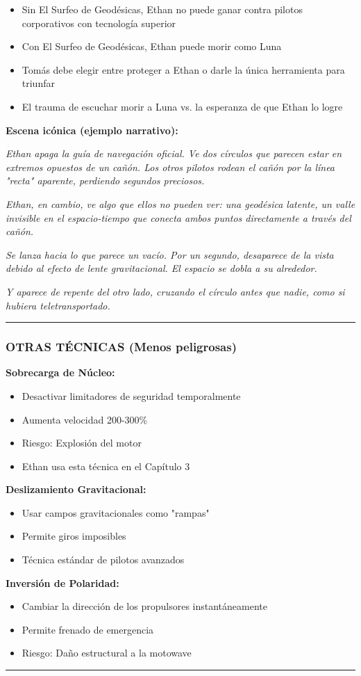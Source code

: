 \documentclass[11pt,a4paper]{report}
\begin{document}
\begin{itemize}
  \item Sin El Surfeo de Geodésicas, Ethan no puede ganar contra pilotos corporativos con tecnología superior
  \item Con El Surfeo de Geodésicas, Ethan puede morir como Luna
  \item Tomás debe elegir entre proteger a Ethan o darle la única herramienta para triunfar
  \item El trauma de escuchar morir a Luna vs. la esperanza de que Ethan lo logre

\end{itemize}
\textbf{Escena icónica (ejemplo narrativo):}

\textit{Ethan apaga la guía de navegación oficial. Ve dos círculos que parecen estar en extremos opuestos de un cañón. Los otros pilotos rodean el cañón por la línea "recta" aparente, perdiendo segundos preciosos.}

\textit{Ethan, en cambio, ve algo que ellos no pueden ver: una geodésica latente, un valle invisible en el espacio-tiempo que conecta ambos puntos directamente a través del cañón.}

\textit{Se lanza hacia lo que parece un vacío. Por un segundo, desaparece de la vista debido al efecto de lente gravitacional. El espacio se dobla a su alrededor.}

\textit{Y aparece de repente del otro lado, cruzando el círculo antes que nadie, como si hubiera teletransportado.}

\bigskip\hrule\bigskip

\subsubsection{OTRAS TÉCNICAS (Menos peligrosas)}

\textbf{Sobrecarga de Núcleo:}
\begin{itemize}
  \item Desactivar limitadores de seguridad temporalmente
  \item Aumenta velocidad 200-300\%
  \item Riesgo: Explosión del motor
  \item Ethan usa esta técnica en el Capítulo 3

\end{itemize}
\textbf{Deslizamiento Gravitacional:}
\begin{itemize}
  \item Usar campos gravitacionales como "rampas"
  \item Permite giros imposibles
  \item Técnica estándar de pilotos avanzados

\end{itemize}
\textbf{Inversión de Polaridad:}
\begin{itemize}
  \item Cambiar la dirección de los propulsores instantáneamente
  \item Permite frenado de emergencia
  \item Riesgo: Daño estructural a la motowave

\end{itemize}
\bigskip\hrule\bigskip
\end{document}
